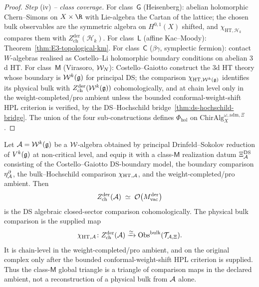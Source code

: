 \begin{proof}
\emph{Step} (iv) \emph{-- class coverage.}
For class~$\mathsf{G}$ (Heisenberg): abelian holomorphic Chern--Simons
on $X\times\R$ with Lie-algebra the Cartan of the lattice; the chosen
bulk observables are the symmetric algebra on $H^{0,1}(X)$ shifted,
and \(\chi_{\mathrm{HT},\mathcal H_k}\) compares them with
$Z^{\mathrm{der}}_{\mathrm{ch}}(\mathcal{H}_k)$.
For class~$\mathsf{L}$ (affine Kac--Moody):
Theorem~\ref{thm:E3-topological-km}.
For class~$\mathsf{C}$ ($\beta\gamma$, symplectic fermion): contact
$W$-algebras realised as Costello--Li holomorphic boundary conditions
on abelian $3$d HT.
For class~$\mathsf{M}$ (Virasoro, $\mathcal{W}_N$): Costello--Gaiotto construct
the $3$d HT theory whose boundary is $\mathcal{W}^k(\mathfrak{g})$ for principal DS;
the comparison
\(\chi_{\mathrm{HT},\mathcal{W}^k(\mathfrak{g})}\) identifies its physical bulk with
$Z^{\mathrm{der}}_{\mathrm{ch}}(\mathcal{W}^k(\mathfrak{g}))$ cohomologically, and at
chain level only in the weight-completed/pro ambient unless the bounded
conformal-weight-shift HPL criterion is verified, by the
DS--Hochschild bridge~\ref{thm:ds-hochschild-bridge}.
The union of the four sub-constructions defines $\Phi_{\mathrm{hol}}$
on $\mathrm{ChirAlg}^{\omega,\mathrm{adm},\Xi}_X$.
\end{proof}

\begin{corollary}%
\label{thm:class-M-chain-bulk}%
%
%
%
Let $\mathcal{A}=\mathcal{W}^k(\mathfrak{g})$ be a $\mathcal{W}$-algebra obtained by principal
Drinfeld--Sokolov reduction of $V^k(\mathfrak{g})$ at non-critical level, and
equip it with a class-\(\mathsf M\) realization datum
\(\Xi_{\mathcal{A}}^{\mathrm{DS}}\) consisting of the Costello--Gaiotto
DS-boundary model, the boundary comparison \(\eta^\partial_{\mathcal{A}}\), the
bulk--Hochschild comparison \(\chi_{\mathrm{HT},\mathcal{A}}\), and the
weight-completed/pro ambient.  Then
\[
Z^{\mathrm{der}}_{\mathrm{ch}}(\mathcal{A})
\;\simeq\;
\mathcal{O}\bigl(M_{\mathrm{vac}}^{\mathrm{der}}\bigr)
\]
is the DS algebraic closed-sector comparison cohomologically.  The
physical bulk comparison is the supplied map
\[
\chi_{\mathrm{HT},\mathcal{A}}\colon
Z^{\mathrm{der}}_{\mathrm{ch}}(\mathcal{A})
\xrightarrow{\simeq}
\mathrm{Obs}^{\mathrm{bulk}}(\mathcal{T}_{\mathcal{A},\Xi}).
\]
It is chain-level in the weight-completed/pro ambient, and on the
original complex only after the bounded conformal-weight-shift HPL
criterion is supplied.  Thus the class-\(\mathsf M\) global triangle is
a triangle of comparison maps in the declared ambient, not a
reconstruction of a physical bulk from \(\mathcal{A}\) alone.
\end{corollary}

